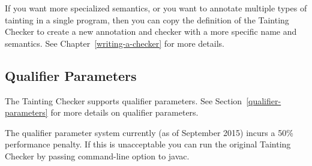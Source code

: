 If you want more specialized semantics, or you want to annotate multiple
types of tainting in a single program, then you can copy the definition of
the Tainting Checker to create a new annotation and checker with a more
specific name and semantics.  See Chapter~\ref{writing-a-checker} for more
details.

\subsection{Qualifier Parameters\label{tainting-qual-params}}
The Tainting Checker supports qualifier parameters.
See Section~\ref{qualifier-parameters} for more details on qualifier parameters.

The qualifier parameter system currently (as of September 2015)
incurs a 50\% performance penalty. If this is unacceptable you can run the
original Tainting Checker by passing 
command-line option to javac.


